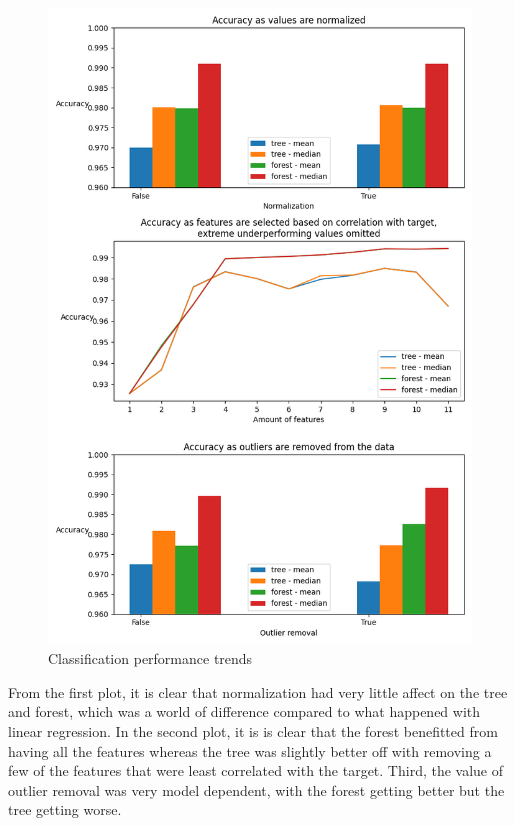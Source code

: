 \documentclass[12pt, letterpaper]{article}
\begin{document}
\begin{figure}[H]
    \centering
    \includegraphics[scale=0.7]{classification_performance.png}
    \caption{Classification performance trends}
    \label{cls_plt} %
\end{figure}

From the first plot, it is clear that normalization had very little affect on the tree and forest, which was a world of difference compared to what happened with linear regression. In the second plot, it is is clear that the forest benefitted from having all the features whereas the tree was slightly better off with removing a few of the features that were least correlated with the target. Third, the value of outlier removal was very model dependent, with the forest getting better but the tree getting worse.
\end{document}
